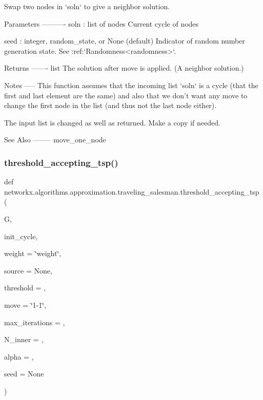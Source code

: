 \begin{DoxyVerb}Swap two nodes in `soln` to give a neighbor solution.

Parameters
----------
soln : list of nodes
    Current cycle of nodes

seed : integer, random_state, or None (default)
    Indicator of random number generation state.
    See :ref:`Randomness<randomness>`.

Returns
-------
list
    The solution after move is applied. (A neighbor solution.)

Notes
-----
    This function assumes that the incoming list `soln` is a cycle
    (that the first and last element are the same) and also that
    we don't want any move to change the first node in the list
    (and thus not the last node either).

    The input list is changed as well as returned. Make a copy if needed.

See Also
--------
    move_one_node
\end{DoxyVerb}
 \mbox{\label{namespacenetworkx_1_1algorithms_1_1approximation_1_1traveling__salesman_aada31f6fee5230024ff9b5f1c27118aa}} 
\subsubsection{\texorpdfstring{threshold\+\_\+accepting\+\_\+tsp()}{threshold\_accepting\_tsp()}}
{\footnotesize\ttfamily def networkx.\+algorithms.\+approximation.\+traveling\+\_\+salesman.\+threshold\+\_\+accepting\+\_\+tsp (\begin{DoxyParamCaption}\item[{}]{G,  }\item[{}]{init\+\_\+cycle,  }\item[{}]{weight = {\ttfamily \char`\"{}weight\char`\"{}},  }\item[{}]{source = {\ttfamily None},  }\item[{}]{threshold = {},  }\item[{}]{move = {\ttfamily \char`\"{}1-\/1\char`\"{}},  }\item[{}]{max\+\_\+iterations = {},  }\item[{}]{N\+\_\+inner = {},  }\item[{}]{alpha = {},  }\item[{}]{seed = {\ttfamily None} }\end{DoxyParamCaption})}

